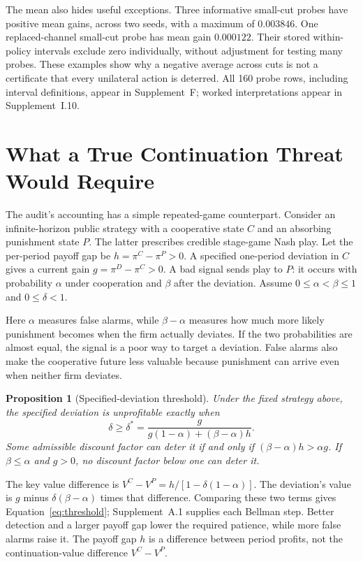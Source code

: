 \documentclass{article}
\newtheorem{proposition}{Proposition}
\begin{document}
The mean also hides useful exceptions. Three informative small-cut probes have positive mean gains, across two seeds, with a maximum of $0.003846$. One replaced-channel small-cut probe has mean gain $0.000122$. Their stored within-policy intervals exclude zero individually, without adjustment for testing many probes. These examples show why a negative average across cuts is not a certificate that every unilateral action is deterred. All 160 probe rows, including interval definitions, appear in Supplement~F; worked interpretations appear in Supplement~I.10.

\section{What a True Continuation Threat Would Require}

The audit's accounting has a simple repeated-game counterpart. Consider an infinite-horizon public strategy with a cooperative state $C$ and an absorbing punishment state $P$. The latter prescribes credible stage-game Nash play. Let the per-period payoff gap be $h=\pi^C-\pi^P>0$. A specified one-period deviation in $C$ gives a current gain $g=\pi^D-\pi^C>0$. A bad signal sends play to $P$: it occurs with probability $\alpha$ under cooperation and $\beta$ after the deviation. Assume $0\le\alpha<\beta\le1$ and $0\le\delta<1$.

Here $\alpha$ measures false alarms, while $\beta-\alpha$ measures how much more likely punishment becomes when the firm actually deviates. If the two probabilities are almost equal, the signal is a poor way to target a deviation. False alarms also make the cooperative future less valuable because punishment can arrive even when neither firm deviates.

\begin{proposition}[Specified-deviation threshold]\label{prop:threshold}
Under the fixed strategy above, the specified deviation is unprofitable exactly when
\begin{equation}
\delta\ge\delta^*=\frac{g}{g(1-\alpha)+(\beta-\alpha)h}.
\label{eq:threshold}
\end{equation}
Some admissible discount factor can deter it if and only if $(\beta-\alpha)h>\alpha g$. If $\beta\le\alpha$ and $g>0$, no discount factor below one can deter it.
\end{proposition}

The key value difference is $V^C-V^P=h/[1-\delta(1-\alpha)]$. The deviation's value is $g$ minus $\delta(\beta-\alpha)$ times that difference. Comparing these two terms gives Equation~\eqref{eq:threshold}; Supplement~A.1 supplies each Bellman step. Better detection and a larger payoff gap lower the required patience, while more false alarms raise it. The payoff gap $h$ is a difference between period profits, not the continuation-value difference $V^C-V^P$.
\end{document}
